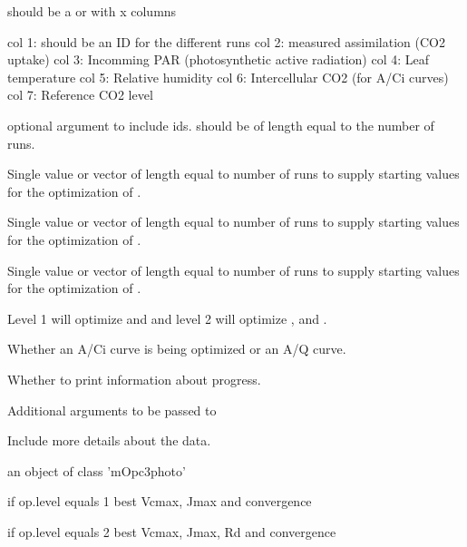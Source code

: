\documentclass[letterpaper]{book}
\begin{document}
\begin{Arguments}
\begin{ldescription}
\item[\code{data}] should be a  or
 with x columns

col 1: should be an ID for the different runs col 2:
measured assimilation (CO2 uptake) col 3: Incomming PAR
(photosynthetic active radiation) col 4: Leaf temperature
col 5: Relative humidity col 6: Intercellular CO2 (for
A/Ci curves) col 7: Reference CO2 level

\item[\code{ID}] optional argument to include ids. should be of
length equal to the number of runs.

\item[\code{iVcmax}] Single value or vector of length equal to
number of runs to supply starting values for the
optimization of .

\item[\code{iJmax}] Single value or vector of length equal to
number of runs to supply starting values for the
optimization of .

\item[\code{iRd}] Single value or vector of length equal to
number of runs to supply starting values for the
optimization of .

\item[\code{op.level}] Level 1 will optimize  and
 and level 2 will optimize ,
 and .

\item[\code{curve.kind}] Whether an A/Ci curve is being
optimized or an A/Q curve.

\item[\code{verbose}] Whether to print information about
progress.

\item[\code{...}] Additional arguments to be passed to
\end{ldescription}
\end{Arguments}
%
\begin{Details}\relax
Include more details about the data.
\end{Details}
%
\begin{Value}
an object of class 'mOpc3photo'

if op.level equals 1 best Vcmax, Jmax and convergence

if op.level equals 2 best Vcmax, Jmax, Rd and convergence



\end{Value}
\end{document}
